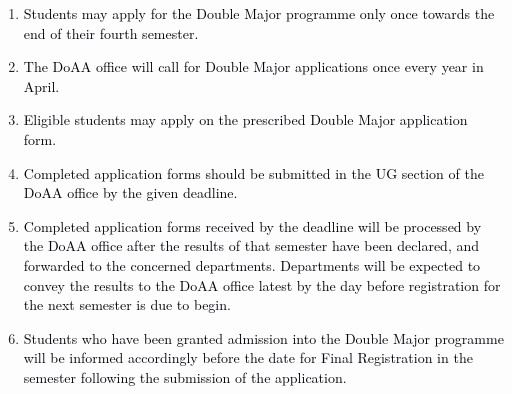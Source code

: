 \documentclass[12pt]{article}
\begin{document}
\vspace{\baselineskip}
\begin{enumerate}
	\item {\fontsize{10pt}{12.0pt}\selectfont \textcolor[HTML]{00000A}{Students may apply for the Double Major programme only once towards the end of their fourth semester.}\par}\par


\vspace{\baselineskip}
	\item {\fontsize{10pt}{12.0pt}\selectfont \textcolor[HTML]{00000A}{The DoAA office will call for Double Major applications once every year in April.}\par}\par


\vspace{\baselineskip}
	\item {\fontsize{10pt}{12.0pt}\selectfont \textcolor[HTML]{00000A}{Eligible students may apply on the prescribed Double Major application form.}\par}\par


\vspace{\baselineskip}
	\item {\fontsize{10pt}{12.0pt}\selectfont \textcolor[HTML]{00000A}{Completed application forms should be submitted in the UG section of the DoAA office by the given deadline.}\par}\par


\vspace{\baselineskip}
	\item {\fontsize{9pt}{10.8pt}\selectfont \textcolor[HTML]{00000A}{Completed application forms received by the deadline will be processed by the DoAA office after the results of that semester have been declared, and forwarded to the concerned departments. Departments will be expected to convey the results to the DoAA office latest by the day before registration for the next semester is due to begin.}\par}\par


\vspace{\baselineskip}
	\item {\fontsize{10pt}{12.0pt}\selectfont \textcolor[HTML]{00000A}{Students who have been granted admission into the Double Major programme will be informed accordingly before the date for Final Registration in the semester following the submission of the application.}\par}
\end{enumerate}\par
\end{document}
